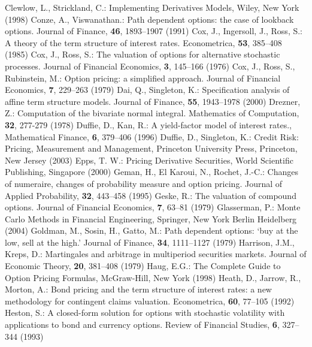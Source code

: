 \begin{thebibliography}{[KLR73]}
Clewlow, L., Strickland, C.: Implementing Derivatives Models, Wiley, New York (1998)
 Conze, A., Viswanathan.: Path dependent options: the case of lookback options. Journal of Finance, \textbf{46},  1893--1907 (1991)
 Cox, J., Ingersoll, J., Ross, S.: A theory of the term structure of interest rates. Econometrica, \textbf{53},  385--408 (1985)
 Cox, J., Ross, S.: The valuation of options for alternative stochastic processes. Journal of Financial Economics, \textbf{3},  145--166 (1976)
 Cox, J., Ross, S., Rubinstein, M.: Option pricing:  a simplified approach. Journal of Financial Economics, \textbf{7},  229--263 (1979)
 Dai, Q., Singleton, K.: Specification analysis of affine term structure models. Journal of Finance, \textbf{55},  1943--1978 (2000)
 Drezner, Z.: Computation of the bivariate normal integral. Mathematics of Computation, \textbf{32},   277-279 (1978)
 Duffie, D., Kan, R.: A yield-factor model of interest rates., Mathematical Finance, \textbf{6}, 379--406 (1996)
Duffie, D., Singleton, K.: Credit Risk:  Pricing, Measurement and Management, Princeton University Press, Princeton, New Jersey (2003)
Epps, T. W.: Pricing Derivative Securities, World Scientific Publishing, Singapore (2000)
 Geman, H., El Karoui, N., Rochet, J.-C.: Changes of numeraire, changes of probability measure and option pricing. Journal of Applied Probability, \textbf{32},  443--458 (1995)
 Geske, R.: The valuation of compound options. Journal of Financial Economics, \textbf{7},  63--81 (1979)
 Glasserman, P.: Monte Carlo Methods in Financial Engineering, Springer, New York Berlin Heidelberg (2004)
 Goldman, M., Sosin, H., Gatto, M.: Path dependent options:  `buy at the low, sell at the high.'  Journal of Finance, \textbf{34},  1111--1127 (1979)
 Harrison, J.M., Kreps, D.: Martingales and arbitrage in multiperiod securities markets. Journal of Economic Theory, \textbf{20},  381--408 (1979)
 Haug, E.G.: The Complete Guide to Option Pricing Formulas, McGraw-Hill, New York (1998)
Heath, D., Jarrow, R., Morton, A.: Bond pricing and the term structure of interest rates:  a new methodology for contingent claims valuation. Econometrica, \textbf{60},  77--105 (1992)
 Heston, S.: A closed-form solution for options with stochastic volatility with applications to bond and currency options. Review of Financial Studies, \textbf{6},  327--344 (1993)

\end{thebibliography}
